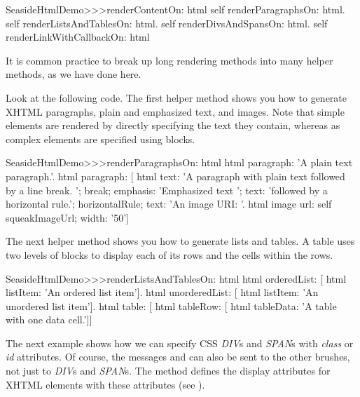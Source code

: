 \documentclass[a4paper,10pt,twoside]{book}
\begin{document}
\begin{code}{}
SeasideHtmlDemo>>>renderContentOn: html 
	self renderParagraphsOn: html.
	self renderListsAndTablesOn: html.
	self renderDivsAndSpansOn: html.
	self renderLinkWithCallbackOn: html
\end{code}

It is common practice to break up long rendering methods into many helper methods, as we have done here.


Look at the following code.  
The first helper method  shows you how to generate XHTML paragraphs, plain and emphasized text, and images.
Note that simple elements are rendered by directly specifying the text they contain, whereas as complex elements are specified using blocks.

\begin{code}{}
SeasideHtmlDemo>>>renderParagraphsOn: html 
	html paragraph: 'A plain text paragraph.'.
	html paragraph: [
		html
			text: 'A paragraph with plain text followed by a line break. ';
			break;
			emphasis: 'Emphasized text ';
			text: 'followed by a horizontal rule.';
			horizontalRule;
			text: 'An image URI: '.
		html image
			url: self squeakImageUrl;
			width: '50']
\end{code}

The next helper method  shows you how to generate lists and tables.
A table uses two levels of blocks to display each of its rows and the cells within the rows.

\begin{code}{}
SeasideHtmlDemo>>>renderListsAndTablesOn: html 
	html orderedList: [
		html listItem: 'An ordered list item'].
	html unorderedList: [
		html listItem: 'An unordered list item'].
	html table: [
		html tableRow: [
			html tableData: 'A table with one data cell.']]
\end{code}

The next example shows how we can specify CSS \emph{DIV}s and \emph{SPAN}s with \emph{class} or \emph{id} attributes.
Of course, the messages  and  can also be sent to the other brushes, not just to \emph{DIV}s and \emph{SPAN}s.
The method  defines the display attributes for XHTML elements with these attributes (see ). 
\end{document}
